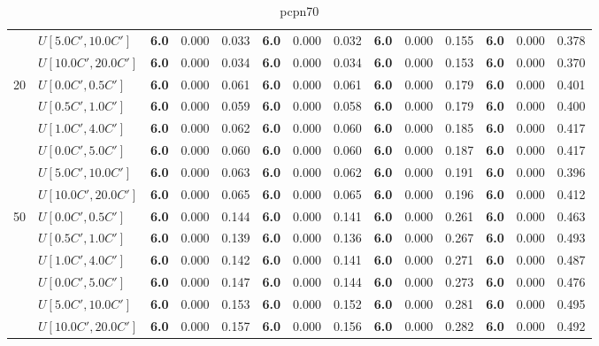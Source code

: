 \begin{table}[h]
{\begin{tabular}{|l|l||l|l|l||l|l|l||l|l|l||l|l|l|}
       & $U[5.0C',10.0C']$ & \textbf{6.0} & 0.000 & 0.033 & \textbf{6.0} & 0.000 & 0.032 & \textbf{6.0} & 0.000 & 0.155 & \textbf{6.0} & 0.000 & 0.378 \\
       & $U[10.0C',20.0C']$ & \textbf{6.0} & 0.000 & 0.034 & \textbf{6.0} & 0.000 & 0.034 & \textbf{6.0} & 0.000 & 0.153 & \textbf{6.0} & 0.000 & 0.370 \\
      \hline\hline
      \multirow{6}{*}{20} & $U[0.0C',0.5C']$ & \textbf{6.0} & 0.000 & 0.061 & \textbf{6.0} & 0.000 & 0.061 & \textbf{6.0} & 0.000 & 0.179 & \textbf{6.0} & 0.000 & 0.401 \\
       & $U[0.5C',1.0C']$ & \textbf{6.0} & 0.000 & 0.059 & \textbf{6.0} & 0.000 & 0.058 & \textbf{6.0} & 0.000 & 0.179 & \textbf{6.0} & 0.000 & 0.400 \\
       & $U[1.0C',4.0C']$ & \textbf{6.0} & 0.000 & 0.062 & \textbf{6.0} & 0.000 & 0.060 & \textbf{6.0} & 0.000 & 0.185 & \textbf{6.0} & 0.000 & 0.417 \\
       & $U[0.0C',5.0C']$ & \textbf{6.0} & 0.000 & 0.060 & \textbf{6.0} & 0.000 & 0.060 & \textbf{6.0} & 0.000 & 0.187 & \textbf{6.0} & 0.000 & 0.417 \\
       & $U[5.0C',10.0C']$ & \textbf{6.0} & 0.000 & 0.063 & \textbf{6.0} & 0.000 & 0.062 & \textbf{6.0} & 0.000 & 0.191 & \textbf{6.0} & 0.000 & 0.396 \\
       & $U[10.0C',20.0C']$ & \textbf{6.0} & 0.000 & 0.065 & \textbf{6.0} & 0.000 & 0.065 & \textbf{6.0} & 0.000 & 0.196 & \textbf{6.0} & 0.000 & 0.412 \\
      \hline\hline
      \multirow{6}{*}{50} & $U[0.0C',0.5C']$ & \textbf{6.0} & 0.000 & 0.144 & \textbf{6.0} & 0.000 & 0.141 & \textbf{6.0} & 0.000 & 0.261 & \textbf{6.0} & 0.000 & 0.463 \\
       & $U[0.5C',1.0C']$ & \textbf{6.0} & 0.000 & 0.139 & \textbf{6.0} & 0.000 & 0.136 & \textbf{6.0} & 0.000 & 0.267 & \textbf{6.0} & 0.000 & 0.493 \\
       & $U[1.0C',4.0C']$ & \textbf{6.0} & 0.000 & 0.142 & \textbf{6.0} & 0.000 & 0.141 & \textbf{6.0} & 0.000 & 0.271 & \textbf{6.0} & 0.000 & 0.487 \\
       & $U[0.0C',5.0C']$ & \textbf{6.0} & 0.000 & 0.147 & \textbf{6.0} & 0.000 & 0.144 & \textbf{6.0} & 0.000 & 0.273 & \textbf{6.0} & 0.000 & 0.476 \\
       & $U[5.0C',10.0C']$ & \textbf{6.0} & 0.000 & 0.153 & \textbf{6.0} & 0.000 & 0.152 & \textbf{6.0} & 0.000 & 0.281 & \textbf{6.0} & 0.000 & 0.495 \\
       & $U[10.0C',20.0C']$ & \textbf{6.0} & 0.000 & 0.157 & \textbf{6.0} & 0.000 & 0.156 & \textbf{6.0} & 0.000 & 0.282 & \textbf{6.0} & 0.000 & 0.492 \\
      \hline
      \end{tabular}
      }
      \caption{pcpn70}
      \label{tab:pcpn70}\end{table}


